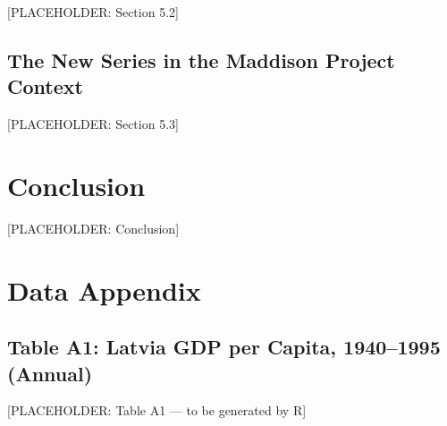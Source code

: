 \documentclass[12pt,a4paper]{article}
\begin{document}
[PLACEHOLDER: Section 5.2]

\subsection{The New Series in the Maddison Project Context}
\label{sec:comparative-maddison}

[PLACEHOLDER: Section 5.3]


\section{Conclusion}
\label{sec:conclusion}

[PLACEHOLDER: Conclusion]


\clearpage
\printbibliography


\clearpage
\appendix

\section{Data Appendix}
\label{sec:appendix}

\subsection*{Table A1: Latvia GDP per Capita, 1940--1995 (Annual)}
\label{tab:a1}
[PLACEHOLDER: Table A1 — to be generated by R]
\end{document}
